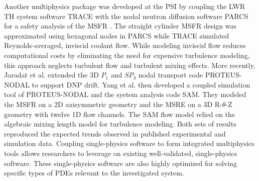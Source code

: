 Another multiphysics package was developed at
the \gls{PSI} by coupling the \gls{LWR} \gls{TH} system software \gls{TRACE} \cite{nrc_trace_2007}
with the nodal neutron diffusion software \gls{PARCS} \cite{downar_parcs_2010} for a safety
analysis of the \gls{MSFR} \cite{pettersen_coupled_2016}. The straight cylinder \gls{MSFR} design
was approximated using hexagonal nodes in \gls{PARCS} while \gls{TRACE} simulated
Reynolds-averaged, inviscid coolant flow. While modeling inviscid flow reduces computational costs
by eliminating the need for expensive turbulence modeling, this approach neglects turbulent flow
and turbulent mixing effects. More recently, Jaradat et al. \cite{jaradat_development_2021}
extended the 3D $P_1$ and $SP_3$ nodal transport code PROTEUS-NODAL to support \gls{DNP} drift.
Yang et al. \cite{yang_development_2022} then developed a coupled simulation tool of PROTEUS-NODAL
and the system analysis code \gls{SAM}. They modeled the \gls{MSFR} on a 2D axisymmetric geometry
and the \gls{MSRE} on a 3D R-$\theta$-Z geometry with twelve 1D flow channels. The \gls{SAM} flow
model relied on the algebraic mixing length model for turbulence modeling. Both sets of results
reproduced the expected trends observed in published experimental and simulation data. Coupling
single-physics software to form integrated multiphysics tools allows researchers to leverage on
existing well-validated, single-physics software. These single-physics software are also highly
optimized for solving specific types of \glspl{PDE} relevant to the investigated system.

